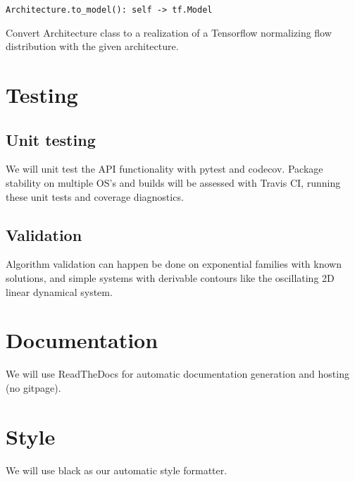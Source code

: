 \documentclass[11pt]{article}
\begin{document}
\begin{verbatim}
Architecture.to_model(): self -> tf.Model
\end{verbatim}
Convert Architecture class to a realization of a Tensorflow normalizing flow distribution with the given architecture.

\section{Testing}
\subsection{Unit testing}
We will unit test the API functionality with pytest and codecov.  Package stability on multiple OS's and builds will be assessed with Travis CI, running these unit tests and coverage diagnostics.

\subsection{Validation}
Algorithm validation can happen be done on exponential families with known solutions, and simple systems with derivable contours like the oscillating 2D linear dynamical system.

\section{Documentation}
We will use ReadTheDocs for automatic documentation generation and hosting (no gitpage).

\section{Style}
We will use black as our automatic style formatter.



\end{document}
